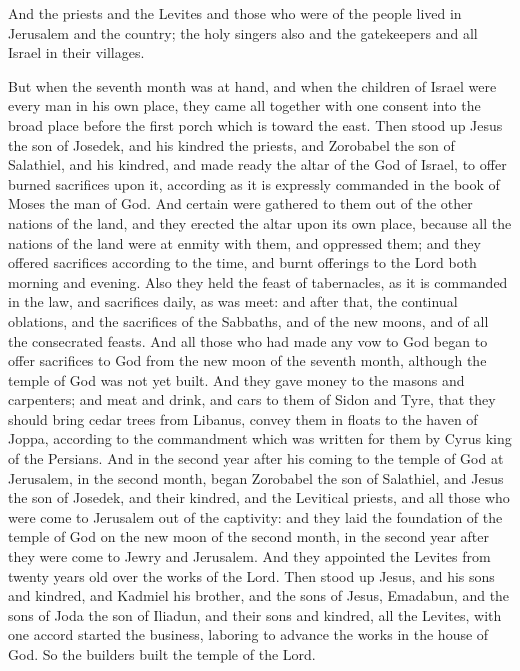 {And the priests and the Levites and those who were of the people lived in Jerusalem and the country; the holy singers also and the gatekeepers and all Israel in their villages.
\par }{\PP {}But when the seventh month was at hand, and when the children of Israel were every man in his own place, they came all together with one consent into the broad place before the first porch which is toward the east.
Then stood up Jesus the son of Josedek, and his kindred the priests, and Zorobabel the son of Salathiel, and his kindred, and made ready the altar of the God of Israel,
to offer burned sacrifices upon it, according as it is expressly commanded in the book of Moses the man of God.
And certain were gathered to them out of the other nations of the land, and they erected the altar upon its own place, because all the nations of the land were at enmity with them, and oppressed them; and they offered sacrifices according to the time, and burnt offerings to the Lord both morning and evening.
Also they held the feast of tabernacles, as it is commanded in the law, and
{} sacrifices daily, as was meet:
and after that, the continual oblations, and the sacrifices of the Sabbaths, and of the new moons, and of all the consecrated feasts.
And all those who had made any vow to God began to offer sacrifices to God from the new moon of the
 seventh month, although the temple of God was not yet built.
And they gave money to the masons and carpenters; and meat and drink,
and cars to them of Sidon and Tyre, that they should bring cedar trees from Libanus,
{} convey them in floats to the haven of Joppa, according to the commandment which was written for them by Cyrus king of the Persians.
And in the second year after his coming to the temple of God at Jerusalem, in the second month, began Zorobabel the son of Salathiel, and Jesus the son of Josedek, and their kindred, and the Levitical priests, and all those who were come to Jerusalem out of the captivity:
and they laid the foundation of the temple of God on the new moon of the second month, in the second year after they were come to Jewry and Jerusalem.
 And they appointed the Levites from twenty years old over the works of the Lord. Then stood up Jesus, and his sons and kindred, and Kadmiel his brother, and the sons of Jesus, Emadabun, and the sons of Joda the son of Iliadun, and their sons and kindred, all the Levites, with one accord started the business, laboring to advance the works in the house of God. So the builders built the temple of the Lord.
}
